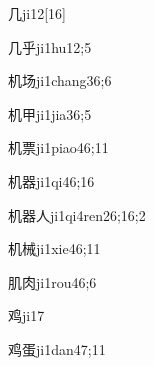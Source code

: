 
\begin{verbete}{几}{ji1}{2}[16]
\end{verbete}

\begin{verbete}{几乎}{ji1hu1}{2;5}
\end{verbete}

\begin{verbete}{机场}{ji1chang3}{6;6}
\end{verbete}

\begin{verbete}{机甲}{ji1jia3}{6;5}
\end{verbete}

\begin{verbete}{机票}{ji1piao4}{6;11}
\end{verbete}

\begin{verbete}{机器}{ji1qi4}{6;16}
\end{verbete}

\begin{verbete}{机器人}{ji1qi4ren2}{6;16;2}
\end{verbete}

\begin{verbete}{机械}{ji1xie4}{6;11}
\end{verbete}

\begin{verbete}{肌肉}{ji1rou4}{6;6}
\end{verbete}

\begin{verbete}{鸡}{ji1}{7}
\end{verbete}

\begin{verbete}{鸡蛋}{ji1dan4}{7;11}
\end{verbete}

